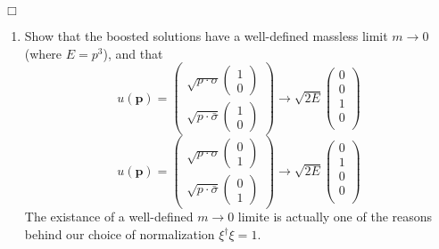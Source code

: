 \documentclass[12pt]{article}
\newcommand{\qedwhite}{\hfill \ensuremath{\Box}}
\begin{document}
\qedwhite

\color{black}

\begin{enumerate}[label=(\alph*), start = 1]
    \item Show that the boosted solutions have a well-defined massless limit $m\rightarrow 0$ (where $E=p^3$), and that
        \[
            u(\mathbf{p}) = 
                \begin{pmatrix}
                    \sqrt{p\cdot \sigma}\begin{pmatrix}1 \\ 0\end{pmatrix} \\
                    \sqrt{p\cdot \bar{\sigma}}\begin{pmatrix}1 \\ 0\end{pmatrix}
                    \end{pmatrix} \rightarrow \sqrt{2E}\begin{pmatrix}
                    0\\
                    0\\
                    1\\
                    0\\
                \end{pmatrix}
        \]
        \[
            u(\mathbf{p}) = 
                \begin{pmatrix}
                    \sqrt{p\cdot \sigma}\begin{pmatrix}0 \\ 1\end{pmatrix} \\
                    \sqrt{p\cdot \bar{\sigma}}\begin{pmatrix}0 \\ 1\end{pmatrix}
                    \end{pmatrix} \rightarrow \sqrt{2E}\begin{pmatrix}
                    0\\
                    1\\
                    0\\
                    0\\
                \end{pmatrix}
        \]
        The existance of a well-defined $m\rightarrow 0$ limite is actually one of the reasons behind our choice of normalization $\xi^\dagger \xi = 1$.

\end{enumerate}
\end{document}
